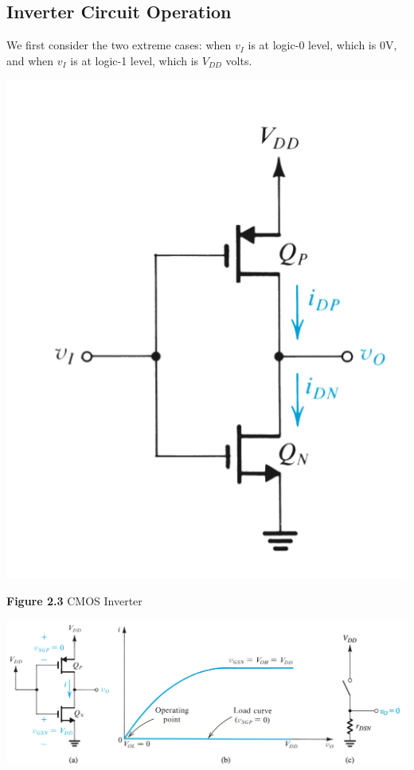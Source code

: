 \documentclass[12pt]{article}
\begin{document}
    \subsection*{Inverter Circuit Operation}

    We first consider the two extreme cases: when $v_I$ is at logic-0 level, which is 0V, and 
    when $v_I$ is at logic-1 level, which is $V_{DD}$ volts.

    \begin{center}
        \includegraphics[scale=0.6]{figures/fig10.png}
    \end{center}
    \textbf{Figure 2.3} CMOS Inverter

    \begin{center}
        \includegraphics[scale=0.45]{figures/fig11.png}
    \end{center}
\end{document}

